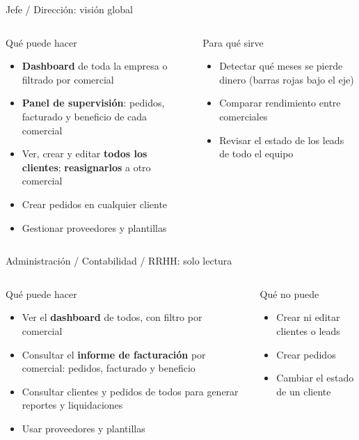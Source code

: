 \documentclass[aspectratio=169,11pt]{beamer}
\begin{document}
\begin{frame}{Jefe / Direcci\'on: visi\'on global}
  \begin{columns}[T]
    \begin{block}{Qu\'e puede hacer}
      \begin{itemize}
        \item \textbf{Dashboard} de toda la empresa o filtrado por comercial
        \item \textbf{Panel de supervisi\'on}: pedidos, facturado y beneficio de cada comercial
        \item Ver, crear y editar \textbf{todos los clientes}; \textbf{reasignarlos} a otro comercial
        \item Crear pedidos en cualquier cliente
        \item Gestionar proveedores y plantillas
      \end{itemize}
    \end{block}
    \begin{block}{Para qu\'e sirve}
      \begin{itemize}
        \item Detectar qu\'e meses se pierde dinero (barras rojas bajo el eje)
        \item Comparar rendimiento entre comerciales
        \item Revisar el estado de los leads de todo el equipo
      \end{itemize}
    \end{block}
  \end{columns}
\end{frame}

\begin{frame}{Administraci\'on / Contabilidad / RRHH: solo lectura}
  \begin{columns}[T]
    \begin{block}{Qu\'e puede hacer}
      \begin{itemize}
        \item Ver el \textbf{dashboard} de todos, con filtro por comercial
        \item Consultar el \textbf{informe de facturaci\'on} por comercial: pedidos, facturado y beneficio
        \item Consultar clientes y pedidos de todos para generar reportes y liquidaciones
        \item Usar proveedores y plantillas
      \end{itemize}
    \end{block}
    \begin{alertblock}{Qu\'e no puede}
      \begin{itemize}
        \item Crear ni editar clientes o leads
        \item Crear pedidos
        \item Cambiar el estado de un cliente
      \end{itemize}
    \end{alertblock}
  \end{columns}
\end{frame}
\end{document}
